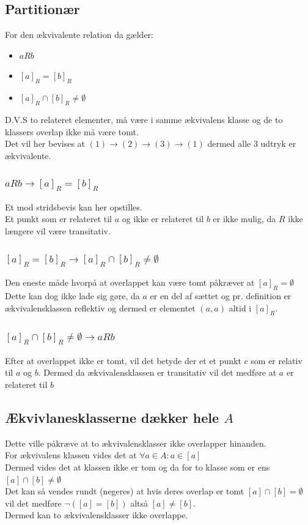 \documentclass[12pt, a4paper]{article}
\begin{document}
				\subsection{Partitionær}
					For den ækvivalente relation da gælder: \\
					\begin{itemize}
						\item $a R b$
						\item $[a]_R=[b]_R$
						\item $[a]_R\cap [b]_R\neq \emptyset$
					\end{itemize}
					D.V.S to relateret elementer, må være i samme ækvivalens klasse og de to klassers overlap ikke må være tomt.\\
					Det vil her bevises at $(1)\rightarrow (2)\rightarrow (3)\rightarrow (1)$ dermed alle 3 udtryk er ækvivalente.
					\subsubsection{$a R b\rightarrow [a]_R=[b]_R$}
						Et \; mod \;stridsbevis kan her opstilles.\\
						Et punkt som er relateret til $a$ og ikke er relateret til $b$ er ikke mulig, da $R$ ikke længere vil være transitativ.
					\subsubsection{$[a]_R=[b]_R\rightarrow [a]_R\cap [b]_R\neq \emptyset$}
						Den eneste måde hvorpå at overlappet kan være tomt påkræver at $[a]_R=\emptyset$\\
						Dette kan dog ikke lade sig gøre, da $a$ er en del af sættet og pr. definition er ækvivalensklassen reflektiv og dermed er elementet $(a,a)$ altid i $[a]_R$.
					\subsubsection{$[a]_R \cap [b]_R \neq \emptyset \rightarrow a R b$}
						Efter at overlappet ikke er tomt, vil det betyde der et et punkt $c$ som er relativ til $a$ og $b$. Dermed da ækvivalensklassen er transitativ vil det medføre at $a$ er relateret til $b$\\[5mm]
					\subsection{Ækvivlanesklasserne dækker hele $A$}
						Dette ville påkræve at to ækvivalensklasser ikke overlapper hinanden.\\
						For ækvivalens klassen vides det at $\forall a \in A: a\in [a]$\\
						Dermed vides det at klassen ikke er tom og da for to klasse som er ens $[a]\cap [b]\neq \emptyset$ \\
						Det kan så vendes rundt (negeres) at hvis deres overlap er tomt $[a]\cap [b]=\emptyset$ vil det medføre $\neg([a]=[b])$ altså $[a]\neq [b]$.\\
						Dermed kan to ækvivalensklasser ikke overlappe.
									
\end{document}
